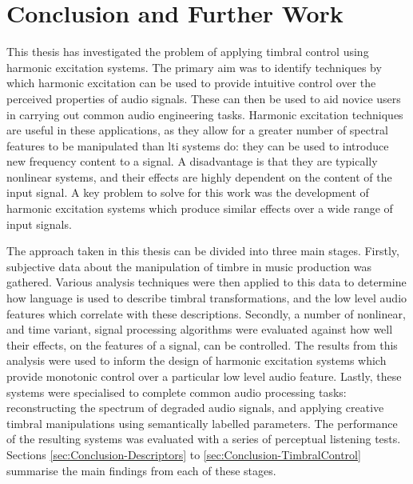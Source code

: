 \chapter{Conclusion and Further Work}
\label{chap:Conclusion}

	This thesis has investigated the problem of applying timbral control using harmonic excitation systems. The primary
	aim was to identify techniques by which harmonic excitation can be used to provide intuitive control over the
	perceived properties of audio signals. These can then be used to aid novice users in carrying out common audio
	engineering tasks. Harmonic excitation techniques are useful in these applications, as they allow for a greater
	number of spectral features to be manipulated than \acrshort{lti} systems do: they can be used to introduce new
	frequency content to a signal. A disadvantage is that they are typically nonlinear systems, and their effects are
	highly dependent on the content of the input signal. A key problem to solve for this work was the development of
	harmonic excitation systems which produce similar effects over a wide range of input signals.

	The approach taken in this thesis can be divided into three main stages. Firstly, subjective data about the
	manipulation of timbre in music production was gathered. Various analysis techniques were then applied to this data
	to determine how language is used to describe timbral transformations, and the low level audio features which
	correlate with these descriptions. Secondly, a number of nonlinear, and time variant, signal processing algorithms
	were evaluated against how well their effects, on the features of a signal, can be controlled. The results from this
	analysis were used to inform the design of harmonic excitation systems which provide monotonic control over a
	particular low level audio feature. Lastly, these systems were specialised to complete common audio processing
	tasks: reconstructing the spectrum of degraded audio signals, and applying creative timbral manipulations using
	semantically labelled parameters. The performance of the resulting systems was evaluated with a series of perceptual
	listening tests. Sections \ref{sec:Conclusion-Descriptors} to \ref{sec:Conclusion-TimbralControl} summarise the main
	findings from each of these stages.


